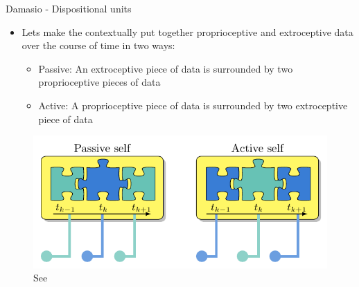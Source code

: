 \documentclass[unknownkeysallowed]{beamer}
\begin{document}
\begin{frame}{Damasio - Dispositional units}
	\begin{itemize}
	\item Lets make the contextually put together proprioceptive and extroceptive data over the course of time in two ways:
	\begin{itemize}
		\item Passive: An extroceptive piece of data is surrounded by two proprioceptive pieces of data
		\item Active: A proprioceptive piece of data is surrounded by two extroceptive piece of data 
	\end{itemize}
	\end{itemize}
	\begin{figure}
	\includegraphics[scale=0.3]{regazzoni-2020-multi-sensorial-generative-and-descriptive-self-awareness-models-for-autonomous-systems-fig-2.png}
	\caption{See \cite{regazzoni-2020-multi-sensorial-generative-and-descriptive-self-awareness-models-for-autonomous-systems}}
	\end{figure}
\end{frame}
\end{document}
